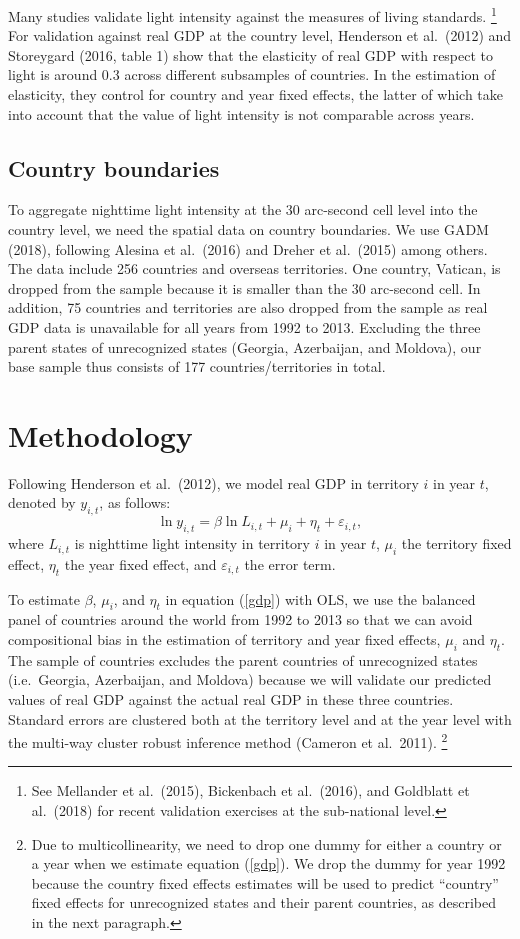 \documentclass[12pt,a4paper]{article}%
\begin{document}
Many studies validate light intensity against the measures of living standards.%
\footnote{See Mellander et al.\ (2015), Bickenbach et al.\ (2016), and Goldblatt et al.\ (2018) for recent validation exercises at the sub-national level.} 
For validation against real GDP at the country level, Henderson et al.\ (2012) and Storeygard (2016, table 1) show that the elasticity of real GDP with respect to light is around 0.3 across different subsamples of countries. 
In the estimation of elasticity, they control for country and year fixed effects, the latter of which take into account that the value of light intensity is not comparable across years.

\subsection{Country boundaries}
To aggregate nighttime light intensity at the 30 arc-second cell level into the country level, we need the spatial data on country boundaries. 
We use GADM (2018), following Alesina et al.\ (2016) and Dreher et al.\ (2015) among others. 
The data include 256 countries and overseas territories. 
One country, Vatican, is dropped from the sample because it is smaller than the 30 arc-second cell. 
In addition, 75 countries and territories are also dropped from the sample as real GDP data is unavailable for all years from 1992 to 2013.
Excluding the three parent states of unrecognized states (Georgia, Azerbaijan, and Moldova), our base sample thus consists of 177 countries/territories in total.
\section{Methodology}
Following Henderson et al.\ (2012), we model real GDP in territory $i$ in year $t$, denoted by $y_{i,t}$, as follows:
\begin{equation}\label{gdp}
\ln y_{i,t} = \beta \ln L_{i,t} + \mu_i + \eta_t + \varepsilon_{i,t},
\end{equation}
where $L_{i,t}$ is nighttime light intensity in territory $i$ in year $t$, $\mu_i$ the territory fixed effect, $\eta_t$ the year fixed effect, and $\varepsilon_{i,t}$ the error term.

To estimate $\beta$, $\mu_i$, and $\eta_t$ in equation (\ref{gdp}) with OLS, we use the balanced panel of countries around the world from 1992 to 2013 so that we can avoid compositional bias in the estimation of territory and year fixed effects, $\mu_i$ and $\eta_t$. 
The sample of countries excludes the parent countries of unrecognized states (i.e.\ Georgia, Azerbaijan, and Moldova) because we will validate our predicted values of real GDP against the actual real GDP in these three countries.
Standard errors are clustered both at the territory level and at the year level with the multi-way cluster robust inference method (Cameron et al.\ 2011).%
\footnote{Due to multicollinearity, we need to drop one dummy for either a country or a year when we estimate equation (\ref{gdp}). We drop the dummy for year 1992 because the country fixed effects estimates will be used to predict ``country'' fixed effects for unrecognized states and their parent countries, as described in the next paragraph.}
\end{document}
